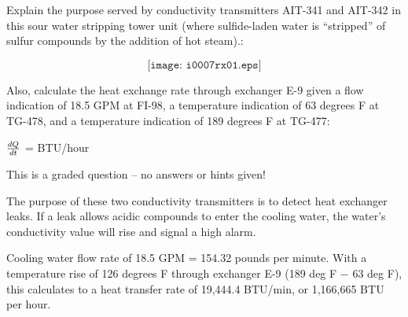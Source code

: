 

Explain the purpose served by conductivity transmitters AIT-341 and AIT-342 in this sour water stripping tower unit (where sulfide-laden water is ``stripped'' of sulfur compounds by the addition of hot steam).:

$$\texttt{[image: i0007rx01.eps]}$$

Also, calculate the heat exchange rate through exchanger E-9 given a flow indication of 18.5 GPM at FI-98, a temperature indication of 63 degrees F at TG-478, and a temperature indication of 189 degrees F at TG-477:

\vskip 10pt

$dQ \over dt$ = \underbar{\hskip 50pt} BTU/hour

\vfil

\eject






This is a graded question -- no answers or hints given!







The purpose of these two conductivity transmitters is to detect heat exchanger leaks.  If a leak allows acidic compounds to enter the cooling water, the water's conductivity value will rise and signal a high alarm.

\vskip 10pt

Cooling water flow rate of 18.5 GPM = 154.32 pounds per minute.  With a temperature rise of 126 degrees F through exchanger E-9 (189 deg F $-$ 63 deg F), this calculates to a heat transfer rate of 19,444.4 BTU/min, or 1,166,665 BTU per hour.




